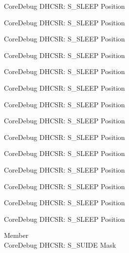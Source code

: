 \begin{DoxyRefList}
\label{deprecated__deprecated000169}%
%
Core\+Debug DHCSR\+: S\+\_\+\+SLEEP Position 

\label{deprecated__deprecated000254}%
%
Core\+Debug DHCSR\+: S\+\_\+\+SLEEP Position 

\label{deprecated__deprecated000311}%
%
Core\+Debug DHCSR\+: S\+\_\+\+SLEEP Position 

\label{deprecated__deprecated000387}%
%
Core\+Debug DHCSR\+: S\+\_\+\+SLEEP Position 

\label{deprecated__deprecated000474}%
%
Core\+Debug DHCSR\+: S\+\_\+\+SLEEP Position 

\label{deprecated__deprecated000576}%
%
Core\+Debug DHCSR\+: S\+\_\+\+SLEEP Position 

\label{deprecated__deprecated000682}%
%
Core\+Debug DHCSR\+: S\+\_\+\+SLEEP Position 

\label{deprecated__deprecated000774}%
%
Core\+Debug DHCSR\+: S\+\_\+\+SLEEP Position 

\label{deprecated__deprecated000828}%
%
Core\+Debug DHCSR\+: S\+\_\+\+SLEEP Position 

\label{deprecated__deprecated000913}%
%
Core\+Debug DHCSR\+: S\+\_\+\+SLEEP Position 

\label{deprecated__deprecated000970}%
%
Core\+Debug DHCSR\+: S\+\_\+\+SLEEP Position 

\label{deprecated__deprecated001046}%
%
Core\+Debug DHCSR\+: S\+\_\+\+SLEEP Position 

\label{deprecated__deprecated001133}%
%
Core\+Debug DHCSR\+: S\+\_\+\+SLEEP Position 

\label{deprecated__deprecated001235}%
%
Core\+Debug DHCSR\+: S\+\_\+\+SLEEP Position  
\item[Member \doxylink{group___c_m_s_i_s___s_c_b_gad37656791dbb216ffb194995f28c412c}{Core\+Debug\+\_\+\+DHCSR\+\_\+\+S\+\_\+\+SUIDE\+\_\+\+Msk} ]\hfill \\
\label{deprecated__deprecated000016}%
%
Core\+Debug DHCSR\+: S\+\_\+\+SUIDE Mask 


\end{DoxyRefList}

